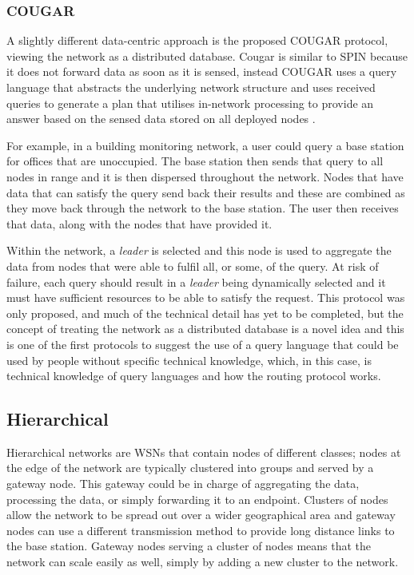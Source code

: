 \subsubsection{COUGAR}
	A slightly different data-centric approach is the proposed COUGAR protocol, viewing the network as a distributed database. Cougar is similar to SPIN because it does not forward data as soon as it is sensed, instead COUGAR uses a query language that abstracts the underlying network structure and uses received queries to generate a plan that utilises in-network processing to provide an answer based on the sensed data stored on all deployed nodes \cite{Yao2002}. 

	For example, in a building monitoring network, a user could query a base station for offices that are unoccupied. The base station then sends that query to all nodes in range and it is then dispersed throughout the network. Nodes that have data that can satisfy the query send back their results and these are combined as they move back through the network to the base station. The user then receives that data, along with the nodes that have provided it.

Within the network, a \textit{leader} is selected and this node is used to aggregate the data from nodes that were able to fulfil all, or some, of the query. At risk of failure, each query should result in a \textit{leader} being dynamically selected and it must have sufficient resources to be able to satisfy the request. This protocol was only proposed, and much of the technical detail has yet to be completed, but the concept of treating the network as a distributed database is a novel idea and this is one of the first protocols to suggest the use of a query language that could be used by people without specific technical knowledge, which, in this case, is technical knowledge of query languages and how the routing protocol works.

\subsection{Hierarchical}
	Hierarchical networks are WSNs that contain nodes of different classes; nodes at the edge of the network are typically clustered into groups and served by a gateway node. This gateway could be in charge of aggregating the data, processing the data, or simply forwarding it to an endpoint. Clusters of nodes allow the network to be spread out over a wider geographical area and gateway nodes can use a different transmission method to provide long distance links to the base station. Gateway nodes serving a cluster of nodes means that the network can scale easily as well, simply by adding a new cluster to the network.

